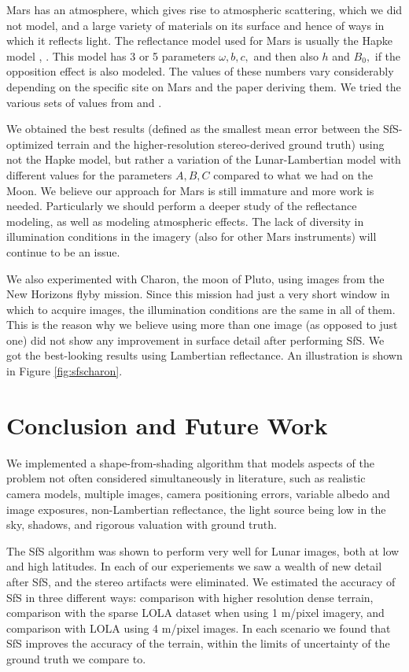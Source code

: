 \documentclass[12pt,oneside]{article}
\begin{document}
Mars has an atmosphere, which gives rise to atmospheric scattering,
which we did not model, and a large variety of materials on its surface
and hence of ways in which it reflects light. The reflectance model used for 
Mars is usually the Hapke model \cite{hapke2008bidirectional}, \cite{hapke1993opposition}.
This model has 3 or 5 parameters $\omega, b, c,$ and then also $h$ and $B_0,$ 
if the opposition effect is also modeled. The values of these numbers vary considerably
depending on the specific site on Mars and the paper deriving them. We tried 
the various sets of values from \cite{johnson2006spectrophotometric} and \cite{fernando2013surface}.

We obtained the best results (defined as the smallest mean error between the
SfS-optimized terrain and the higher-resolution stereo-derived ground truth) using not the Hapke model,
but rather a variation of the Lunar-Lambertian model with different
values for the parameters $A, B, C$ compared to what we had on the Moon.
We believe our approach for Mars is still immature and more work is
needed. Particularly we should perform a deeper study of the
reflectance modeling, as well as modeling atmospheric effects. The lack of diversity 
in illumination conditions in the imagery (also for other Mars instruments) will continue to be an issue.

We also experimented with Charon, the moon of Pluto, using images from
the New Horizons flyby mission. Since this mission had just a very short
window in which to acquire images, the illumination conditions are the
same in all of them. This is the reason why we believe using more than
one image (as opposed to just one) did not show any improvement in
surface detail after performing SfS. We got the best-looking results
using Lambertian reflectance. An illustration is shown in Figure
\ref{fig:sfscharon}.

\section{Conclusion and Future Work}

We implemented a shape-from-shading algorithm that models aspects of the
problem not often considered simultaneously in literature, such as
realistic camera models, multiple images, camera positioning errors,
variable albedo and image exposures, non-Lambertian reflectance, the
light source being low in the sky, shadows, and rigorous valuation with
ground truth. 

The SfS algorithm was shown to perform very well for Lunar images, both
at low and high latitudes. In each of our experiements we saw a wealth
of new detail after SfS, and the stereo artifacts were eliminated. We
estimated the accuracy of SfS in three different ways: comparison with
higher resolution dense terrain, comparison with the sparse LOLA dataset
when using 1 m/pixel imagery, and comparison with LOLA using 4 m/pixel
images. In each scenario we found that SfS improves the accuracy of the
terrain, within the limits of uncertainty of the ground truth we compare
to.
\end{document}
